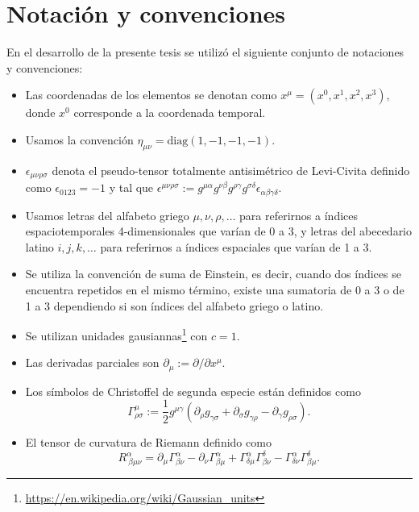 \chapter{Notación y convenciones}
\label{ape:convenciones}

En el desarrollo de la presente tesis se utilizó el siguiente conjunto de notaciones y convenciones:

\begin{itemize}
\item Las coordenadas de los elementos se denotan como $x^{\mu}=\left( x^0, x^1, x^2, x^3 \right)$, donde $x^0$ corresponde a la coordenada temporal.
\item Usamos la convención $\eta_{\mu \nu} = \mathrm{diag}(1,-1,-1,-1)$.
\item $\epsilon_{\mu \nu \rho \sigma}$ denota el pseudo-tensor totalmente antisimétrico de Levi-Civita definido como $\epsilon_{0123}=-1$ y tal que $\epsilon^{\mu \nu \rho \sigma} := g^{\mu \alpha} g^{\nu \beta} g^{\rho \gamma} g^{\sigma \delta} \epsilon_{\alpha \beta \gamma \delta}$.
\item Usamos letras del alfabeto griego $\mu, \nu, \rho, \dots$ para referirnos a índices espaciotemporales 4-dimensionales que varían de 0 a 3, y letras del abecedario latino $i, j, k, \dots$ para referirnos a índices espaciales que varían de 1 a 3.
\item Se utiliza la convención de suma de Einstein, es decir, cuando dos índices se encuentra repetidos en el mismo término, existe una sumatoria de 0 a 3 o de 1 a 3 dependiendo si son índices del alfabeto griego o latino.
\item Se utilizan unidades gausiannas\footnote{\url{https://en.wikipedia.org/wiki/Gaussian_units}} con $c=1$.
\item Las derivadas parciales son $\partial_{\mu} := \partial / \partial x^{\mu}$.
\item Los símbolos de Christoffel de segunda especie están definidos como
\begin{equation}
\Gamma^{\mu}_{\rho \sigma} := \frac{1}{2} g^{\mu \gamma} \left( \partial_{\rho} g_{\gamma \sigma} + \partial_{\sigma} g_{\gamma \rho} - \partial_{\gamma} g_{\rho \sigma} \right).
\end{equation}
\item El tensor de curvatura de Riemann definido como 
\begin{equation}
R^{\alpha}_{\ \beta \mu \nu} = \partial_{\mu} \Gamma^{\alpha}_{\beta \nu} - \partial_{\nu} \Gamma^{\alpha}_{\beta \mu} + \Gamma^{\alpha}_{\delta \mu} \Gamma^{\delta}_{\beta \nu} - \Gamma^{\alpha}_{\delta \nu} \Gamma^{\delta}_{\beta \mu}.

\end{equation}
\end{itemize}
